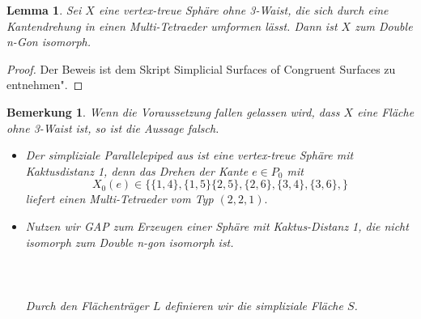 \documentclass[12pt,titlepage,twoside,cleardoublepage]{article}
\theoremstyle{nummermitklammern}
\newtheorem{lemma}[temp]{Lemma}
\newtheorem{bemerkung}[temp]{Bemerkung}
\newtheorem{lemma}[zahl]{Lemma}
\newtheorem{bemerkung}[zahl]{Bemerkung}
\numberwithin{equation}{section}
\begin{document}
\begin{lemma}
Sei $X$ eine vertex-treue Sphäre ohne 3-Waist, die  sich durch eine Kantendrehung in einen Multi-Tetraeder umformen lässt. Dann ist $X$  zum Double n-Gon isomorph.
\end{lemma} 
\begin{proof}
Der Beweis ist dem Skript  Simplicial Surfaces of Congruent Surfaces zu entnehmen".
\end{proof}
\begin{bemerkung}
Wenn die Voraussetzung fallen gelassen wird, dass $X$ eine Fläche ohne 3-Waist ist, so ist die Aussage falsch. 
\begin{itemize}
\item Der simpliziale Parallelepiped aus  ist eine vertex-treue Sphäre mit Kaktusdistanz 1, denn das Drehen der Kante $e\in P_0$ mit 
\[
X_0(e)\in\{\{1,4\},\{1,5\}\{2,5\},\{2,6\},\{3,4\},\{3,6\},\}
\] liefert einen Multi-Tetraeder vom Typ $(2,2,1).$
\item Nutzen wir GAP zum Erzeugen einer Sphäre mit Kaktus-Distanz 1, die nicht isomorph zum Double n-gon isomorph ist. \\\\
\fbox{
\parbox{13.4cm}{
\textcolor{red}{$gap>$} \textcolor{blue}{$L:=[[ 2, 3, 5 ], [ 2, 4, 5 ], [ 3, 4, 5 ], [ 1, 3, 6 ], [ 1, 4, 6 ], 
  [ 3, 4, 6 ], [ 1, 7, 8 ], [ 1, 4, 7 ],\newline [ 2, 4, 7 ], [ 2, 7, 8 ], [ 1, 3, 8 ], [ 2, 3, 8 ] ];;$}
  }}\\\\
  Durch den Flächenträger $L$ definieren wir die simpliziale Fläche $S$.\\\\
  \\\\

\end{itemize}
\end{bemerkung}
\end{document}
